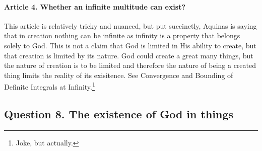 \documentclass{ucetd}
\begin{document}
\paragraph{Article 4. Whether an infinite multitude can exist?}
This article is relatively tricky and nuanced, but put succinctly, Aquinas is saying that in creation nothing can be infinite as infinity is a property that belongs solely to God. This is not a claim that God is limited in His ability to create, but that creation is limited by its nature. God could create a great many things, but the nature of creation is to be limited and therefore the nature of being a created thing limits the reality of its exisitence. See Convergence and Bounding of Definite Integrals at Infinity.\footnote{Joke, but actually.}


\subsection{Question 8. The existence of God in things}
\end{document}
